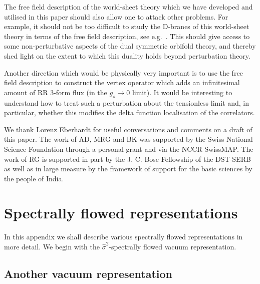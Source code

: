 \documentclass[a4paper,11pt]{article}
\numberwithin{equation}{section}
\begin{document}
The free field description of the world-sheet theory which we have developed and utilised in this paper should also allow one to attack other problems. For example, it should not be too difficult to study the D-branes of this world-sheet theory in terms of the free field description, see e.g.\ \cite{Kawai:2001ur,Gaberdiel:2006pp,Quella:2007sg}. This should give access to some non-perturbative aspects of the dual symmetric orbifold theory, and thereby shed light on the extent to which this duality holds beyond perturbation theory. 

Another direction which would be physically very important is to use the free field description to construct the vertex operator which adds an infinitesimal amount of RR 3-form flux (in the $g_s\rightarrow 0$ limit). It would be interesting to understand how to treat such a perturbation about the tensionless limit and, in particular, whether this modifies the delta function localisation of the correlators. 




\acknowledgments

We thank Lorenz Eberhardt for useful conversations and comments on a draft of this paper. The work of AD, MRG and BK was supported by the Swiss National Science Foundation through a personal grant and via the NCCR SwissMAP. The work of RG is supported in part by the J. C. Bose Fellowship of the DST-SERB as well as in large measure by the framework of support for the basic sciences by the people of India. 



\appendix 

\section{Spectrally flowed representations}\label{app:spectral-flow}

In this appendix we shall describe various spectrally flowed representations in more detail. We begin with the $\hat{\sigma}^2$-spectrally flowed vacuum representation. 

\subsection{Another vacuum representation}\label{app:W}
\end{document}
